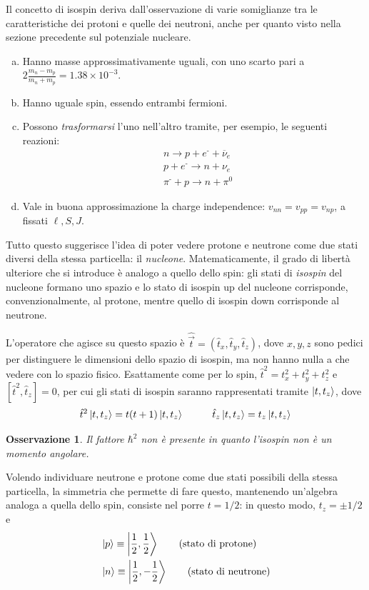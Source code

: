 \documentclass[11pt, a4paper]{scrartcl}
\theoremstyle{style}
\newtheorem{osservazione}{Osservazione}[section]
\numberwithin{equation}{subsection}
\begin{document}
Il concetto di isospin deriva dall'osservazione di varie somiglianze tra le caratteristiche dei protoni e quelle dei neutroni, anche per quanto visto nella sezione precedente sul potenziale nucleare.
\begin{enumerate}[(a).]
	\item Hanno masse approssimativamente uguali, con uno scarto pari a $2\frac{m_n-m_p}{m_n+m_p} = 1.38 \times 10^{-3}$.
	\item Hanno uguale spin, essendo entrambi fermioni.
	\item Possono \textit{trasformarsi} l'uno nell'altro tramite, per esempio, le seguenti reazioni:
		\[
			\begin{split}
				&n \to p + e^\text{-} + \overline{\nu }_e \\
				& p + e^{\text{-}} \to n +  \nu _e\\
				& \pi^{\text{-}} + p \to  n + \pi^{0}
			\end{split}
		\] 
	\item Vale in buona approssimazione la charge independence: $v_{nn} = v_{pp} = v_{np}$, a fissati $\ell ,S,J$.	
\end{enumerate}
Tutto questo suggerisce l'idea di poter vedere protone e neutrone come due stati diversi della stessa particella: il \textit{nucleone}.
Matematicamente, il grado di libert\`a ulteriore che si introduce \`e analogo a quello dello spin: gli stati di \textit{isospin} del nucleone formano uno spazio e lo stato di isospin up del nucleone corrisponde, convenzionalmente, al protone, mentre quello di isospin down corrisponde al neutrone.

L'operatore che agisce su questo spazio \`e $\hat{\vec{t}} = (\hat{t}_x,\hat{t}_y, \hat{t}_z)$, dove $x,y,z$ sono pedici per distinguere le dimensioni dello spazio di isospin, ma non hanno nulla a che vedere con lo spazio fisico.
Esattamente come per lo spin, $\hat{t}^2 = t_x^2 + t_y^2 + t_z^2$ e $[\hat{t}^2 , \hat{t}_z] = 0 $, per cui gli stati di isospin saranno rappresentati tramite $\ket{t,t_z} $, dove 
\[
\hat{t}^2 \ket{t,t_z}  = t (t+1) \ket{t,t_z} \hspace{1cm}\hat{t}_z \ket{t,t_z}  = t_z \ket{t,t_z} 
\] 
\begin{osservazione}
Il fattore $\hbar ^2$ non \`e presente in quanto l'isospin non \`e un momento angolare.
\end{osservazione}

\noindent Volendo individuare neutrone e protone come due stati possibili della stessa particella, la simmetria che permette di fare questo, mantenendo un'algebra analoga a quella dello spin, consiste nel porre $t = 1/2$: in questo modo, $t_z = \pm 1/2$ e 
\begin{align}
	&\ket{p} \equiv \Ket{\frac{1}{2}, \frac{1}{2}}  \tag{stato di protone}\\
	&\ket{n}\equiv \Ket{\frac{1}{2}, -\frac{1}{2}}  \tag{stato di neutrone}
\end{align}
\end{document}
